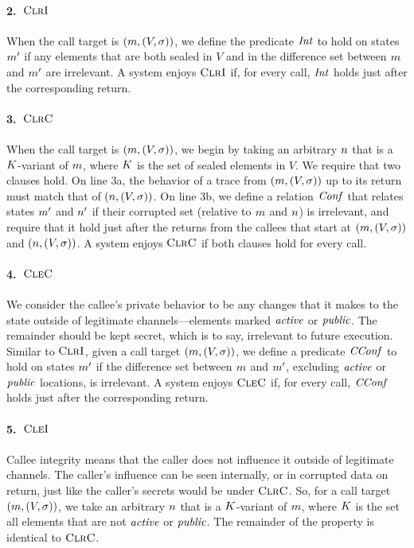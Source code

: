 \documentclass[10pt,conference]{ieeetran}%
\theoremstyle{definition}
\begin{document}
\paragraph*{2.~\(\textnormal{\sc ClrI}\)}
When the call target is \((m,(V,\sigma))\), we define the predicate \(\mathit{Int}\) to hold
on states \(m'\) if any elements that are both sealed in \(V\) and in the difference
set between \(m\) and \(m'\) are irrelevant. A system enjoys \(\textnormal{\sc ClrI}\) if, for every
call, \(\mathit{Int}\) holds just after the corresponding return.

\paragraph*{3.~\(\textnormal{\sc ClrC}\)}
When the call target is \((m,(V,\sigma))\), we begin by taking an arbitrary \(n\)
that is a \(K\)-variant of \(m\), where \(K\) is the set of sealed elements
in \(V\). We require that two clauses hold. On line 3a, the behavior of a trace from
\((m,(V,\sigma))\) up to its return must match that of \((n,(V,\sigma))\).
On line 3b, we define a relation \(\mathit{Conf}\) that relates states \(m'\) and \(n'\)
if their corrupted set (relative to \(m\) and \(n\)) is irrelevant, and require
that it hold just after the returns from the callees that start at \((m,(V,\sigma))\) and \((n,(V,\sigma))\).
A system enjoys \(\textnormal{\sc ClrC}\) if both clauses hold for every call.

\paragraph*{4.~\(\textnormal{\sc CleC}\)}
We consider the callee's private behavior to be any changes that it makes to the state
outside of legitimate channels---elements marked \(\mathit{active}\) or \(\mathit{public}\). The remainder
should be kept secret, which is to say, irrelevant to future execution. Similar to \(\textnormal{\sc ClrI}\), given a call target
\((m,(V,\sigma))\), we define a predicate \(\mathit{CConf}\) to hold
on states \(m'\) if the difference set between \(m\) and \(m'\), excluding 
\(\mathit{active}\) or \(\mathit{public}\) locations, is irrelevant.
A system enjoys \(\textnormal{\sc CleC}\) if, for every call, \(\mathit{CConf}\) holds just after the corresponding return. 

\paragraph*{5.~\(\textnormal{\sc CleI}\)}
Callee integrity means that the caller does not influence it outside of legitimate
channels. The caller's influence can be seen internally, or in corrupted data on return,
just like the caller's secrets would be under \(\textnormal{\sc ClrC}\). So, for a call target
\((m,(V,\sigma))\), we take an arbitrary \(n\) that is a \(K\)-variant
of \(m\), where \(K\) is the set all elements that are not \(\mathit{active}\)
or \(\mathit{public}\). The remainder of the property is identical to \(\textnormal{\sc ClrC}\).
\end{document}
